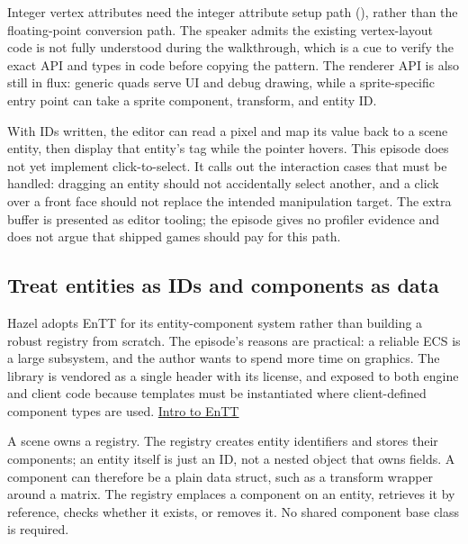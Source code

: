 Integer vertex attributes need the integer attribute setup path (), rather than the floating-point conversion path. The speaker admits the existing vertex-layout code is not fully understood during the walkthrough, which is a cue to verify the exact API and types in code before copying the pattern. The renderer API is also still in flux: generic quads serve UI and debug drawing, while a sprite-specific entry point can take a sprite component, transform, and entity ID.

With IDs written, the editor can read a pixel and map its value back to a scene entity, then display that entity's tag while the pointer hovers. This episode does not yet implement click-to-select. It calls out the interaction cases that must be handled: dragging an entity should not accidentally select another, and a click over a front face should not replace the intended manipulation target. The extra buffer is presented as editor tooling; the episode gives no profiler evidence and does not argue that shipped games should pay for this path.

\subsection{Treat entities as IDs and components as data}\label{06-engine-ii-ch031-treat-entities-as-ids-and-components-as-data}

\hypertarget{06-engine-ii-ch031-treat-entities-as-ids-and-components-as-data}{}

Hazel adopts EnTT for its entity-component system rather than building a robust registry from scratch. The episode's reasons are practical: a reliable ECS is a large subsystem, and the author wants to spend more time on graphics. The library is vendored as a single header with its license, and exposed to both engine and client code because templates must be instantiated where client-defined component types are used. \href{https://www.youtube.com/watch?v=D4hz0wEB978}{Intro to EnTT}

A scene owns a registry. The registry creates entity identifiers and stores their components; an entity itself is just an ID, not a nested object that owns fields. A component can therefore be a plain data struct, such as a transform wrapper around a matrix. The registry emplaces a component on an entity, retrieves it by reference, checks whether it exists, or removes it. No shared component base class is required.

